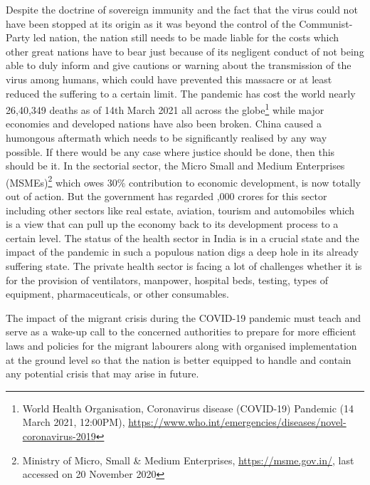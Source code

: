 \begin{multicols}{2}
\noi
Despite the doctrine of sovereign immunity and the fact that the virus could not have been
stopped at its origin as it was beyond the control of the Communist-Party led nation, the
nation still needs to be made liable for the costs which other great nations have to bear just
because of its negligent conduct of not being able to duly inform and give cautions or
warning about the transmission of the virus among humans, which could have prevented this
massacre or at least reduced the suffering to a certain limit. The pandemic has cost the world
nearly 26,40,349 deaths as of 14th March 2021 all across the globe\footnote{World Health Organisation, Coronavirus disease (COVID-19) Pandemic (14 March 2021, 12:00PM),
\url{https://www.who.int/emergencies/diseases/novel-coronavirus-2019}} while major economies
and developed nations have also been broken. China caused a humongous aftermath which
needs to be significantly realised by any way possible. If there would be any case where
justice should be done, then this should be it. In the sectorial sector, the Micro Small and
Medium Enterprises (MSMEs)\footnote{Ministry of Micro, Small \& Medium Enterprises, \url{https://msme.gov.in/}, last accessed on 20 November 2020 } which owes 30\% contribution to economic development, is
now totally out of action. But the government has regarded ,000 crores for this sector
including other sectors like real estate, aviation, tourism and automobiles which is a view that
can pull up the economy back to its development process to a certain level. The status of the
health sector in India is in a crucial state and the impact of the pandemic in such a populous
nation digs a deep hole in its already suffering state. The private health sector is facing a lot of challenges whether it is for the provision of ventilators, manpower, hospital beds, testing,
types of equipment, pharmaceuticals, or other consumables.

\noi
The impact of the migrant crisis during the COVID-19 pandemic must teach and serve as a
wake-up call to the concerned authorities to prepare for more efficient laws and policies for
the migrant labourers along with organised implementation at the ground level so that the
nation is better equipped to handle and contain any potential crisis that may arise in future.


\end{multicols}
